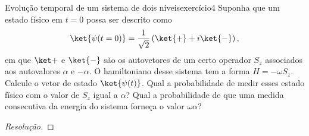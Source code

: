\begin{exercício}{Evolução temporal de um sistema de dois níveis}{exercício4}
    Suponha que um estado físico em \(t = 0\) possa ser descrito como
    \begin{equation*}
        \ket{\psi(t = 0)} = \frac{1}{\sqrt{2}}\left(\ket{+} + i \ket{-}\right),
    \end{equation*}
    em que \(\ket+\) e \(\ket{-}\) são os autovetores de um certo operador \(S_z\) associados aos autovalores \(\alpha\) e \(-\alpha\). O hamiltoniano desse sistema tem a forma \(H = - \omega S_z\). Calcule o vetor de estado \(\ket{\psi(t)}\). Qual a probabilidade de medir esses estado físico com o valor de \(S_z\) igual a \(\alpha\)? Qual a probabilidade de que uma medida consecutiva da energia do sistema forneça o valor \(\omega \alpha\)?
\end{exercício}
\begin{proof}[Resolução]

\end{proof}
